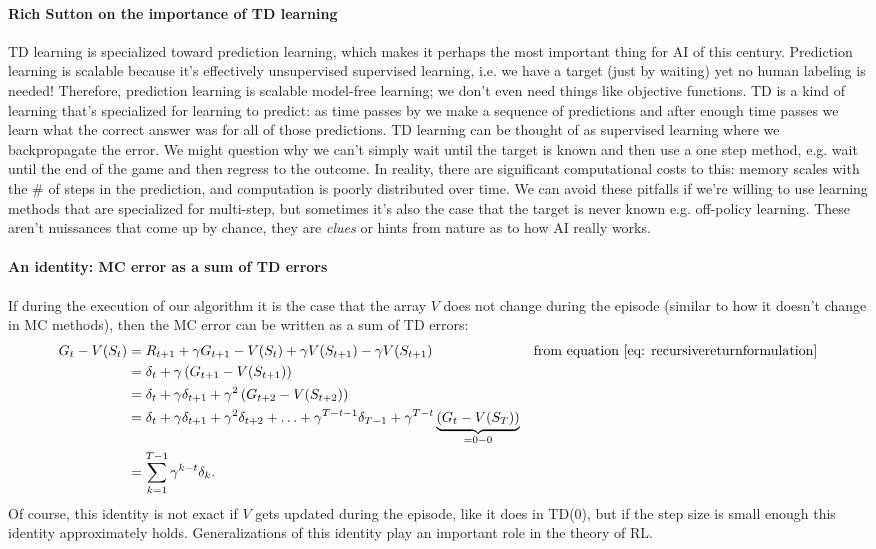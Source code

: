 \documentclass[12pt]{article}
\begin{document}
\paragraph{Rich Sutton on the importance of TD learning}
TD learning is specialized toward prediction learning, which makes it perhaps the most important thing for AI of this century.  Prediction learning is scalable because it's effectively unsupervised supervised learning, i.e. we have a target (just by waiting) yet no human labeling is needed! Therefore, prediction learning is scalable model-free learning; we don't even need things like objective functions. TD is a kind of learning that's specialized for learning to predict: as time passes by we make a sequence of predictions and after enough time passes we learn what the correct answer was for all of those predictions. TD learning can be thought of as supervised learning where we backpropagate the error. We might question why we can't simply wait until the target is known and then use a one step method, e.g. wait until the end of the game and then regress to the outcome. In reality, there are significant computational costs to this: memory scales with the \# of steps in the prediction, and computation is poorly distributed over time. We can avoid these pitfalls if we're willing to use learning methods that are specialized for multi-step, but sometimes it's also the case that the target is never known e.g. off-policy learning. These aren't nuissances that come up by chance, they are \emph{clues} or hints from nature as to how AI really works.

\paragraph{An identity: MC error as a sum of TD errors}
If during the execution of our algorithm it is the case that the array $V$ does not change during the episode (similar to how it doesn't change in MC methods), then the MC error can be written as a sum of TD errors:
\begin{align}
  G_t - V(S_t) &= R_{t+1} + \gamma G_{t+1} - V(S_t) + \gamma V(S_{t+1}) - \gamma   V(S_{t+1}) &\textrm{from equation \ref{eq: recursivereturnformulation}} \\
&= \delta_t + \gamma \left( G_{t+1} - V(S_{t+1})\right) \\
&= \delta_t + \gamma \delta_{t+1} + \gamma^2 \left(G_{t+2} - V(S_{t+2})\right) \\
&= \delta_t + \gamma \delta_{t+1} + \gamma^2 \delta_{t+2} + \ldots + \gamma^{T-t-1} \delta_{T-1} + \gamma^{T-t} \underbrace{\left(G_t - V(S_T)\right)}_{=0-0} \\
&= \sum_{k=1}^{T-1} \gamma^{k-t} \delta_k.
\end{align}
Of course, this identity is not exact if $V$ gets updated during the episode, like it does in TD(0), but if the step size is small enough this identity approximately holds. Generalizations of this identity play an important role in the theory of RL.
\end{document}
